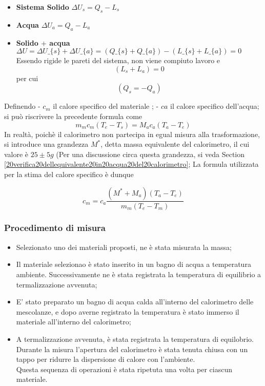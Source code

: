 \documentclass[11pt]{article}
\providecommand{\tightlist}{%
      \setlength{\itemsep}{0pt}\setlength{\parskip}{0pt}}
\begin{document}
    \begin{itemize}
\tightlist
\item
  \textbf{Sistema Solido} \(\Delta U_{s} = Q_{s} - L_{s}\)\\
\item
  \textbf{Acqua} \(\Delta U_{a} = Q_{a} - L_{a}\)\\
\item
  \textbf{Solido \(+\) acqua} $ \Delta U = \Delta U\_\{s\} +
  \Delta U\_\{a\} = (Q\_\{s\} + Q\_\{a\}) - (L\_\{s\} + L\_\{a\}) =
  0$\\
  Essendo rigide le pareti del sistema, non viene compiuto lavoro e
  \[(L_{s} + L_{a}) = 0 \] per cui \[ (Q_{s} = - Q_{a})\]
\end{itemize}

Definendo - \(c_{m}\) il calore specifico del materiale ; - \(c{a}\) il
calore specifico dell'acqua;\\
si può riscrivere la precedente formula come
\[  m_{m}c_{m}(T_{e} - T_{s}) = M_{a}c_{a}(T_{a} - T_{e})\] In realtà,
poichè il calorimetro non partecipa in egual misura alla trasformazione,
si introduce una grandezza \(M^*\), detta massa equivalente del
calorimetro, il cui valore è \(25 \pm 5 g\) (Per una discussione circa
questa grandezza, si veda
Section \ref{20verifica20dellequivalente20in20acqua20del20calorimetro};
La formula utilizzata per la stima del calore specifico è dunque

    \[ c_{m} = c_{a} \frac{(M^* + M_{a})(T_{a}-T_{e})}{m_{m}(T_{e}-T_{m})}\]

\hypertarget{procedimento-di-misura}{%
\subsubsection{Procedimento di misura}\label{procedimento-di-misura}}

\begin{itemize}
\tightlist
\item
  Selezionato uno dei materiali proposti, ne è stata misurata la massa;
\item
  Il materiale selezionao è stato inserito in un bagno di acqua a
  temperatura ambiente. Successivamente ne è stata registrata la
  temperatura di equilibrio a termalizzazione avvenuta;
\item
  E' stato preparato un bagno di acqua calda all'interno del calorimetro
  delle mescolanze, e dopo averne registrato la temperatura è stato
  immerso il materiale all'interno del calorimetro;
\item
  A termalizzazione avvenuta, è stata registrata la temperatura di
  equilobrio.\\
  Durante la misura l'apertura del calorimetro è stata tenuta chiusa con
  un tappo per ridurre la dispersione di calore con l'ambiente.\\
  Questa sequenza di operazioni è stata ripetuta una volta per ciascun
  materiale.
\end{itemize}
\end{document}
